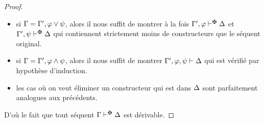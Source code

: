 \begin{proof}
\begin{itemize}
    suffit de prouver à la fois $\varCG', \varFP \vdAbs \varCD$ et
    $\varCG'\vdAbs \varFP,\varCD$, qui ont tous les deux strictement moins de
    constructeurs que notre séquent original~: on peut donc appliquer notre
    hypothèse d'induction.
  \item si $\Gamma = \Gamma', \varphi\lor \psi$, alors il nous suffit de
    montrer
    à la fois $\varCG', \varFF\vdAbs \varCD$ et
    $\varCG',\varFP\vdAbs\varCD$ qui
    contiennent strictement moins de constructeurs que le séquent original.
  \item si $\Gamma = \Gamma', \varphi\land \psi$, alors il nous suffit de
    montrer $\Gamma', \varphi,\psi \vdash \Delta$ qui est vérifié par hypothèse
    d'induction.
  \item les cas où on veut éliminer un constructeur qui est dans $\Delta$
    sont parfaitement analogues aux précédents.
  \end{itemize}
  D'où le fait que tout séquent $\varCG\vdAbs \varCD$ est dérivable.


\end{proof}
